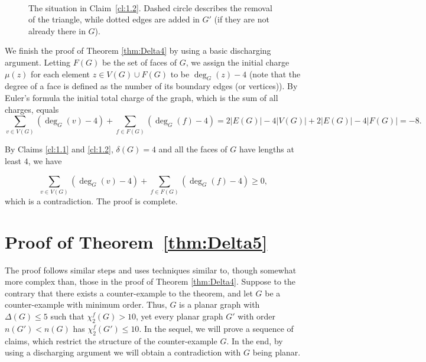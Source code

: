 \documentclass[10pt,a4paper]{article}
\newcommand{\fd}{\chi_{2}^{f}}
\begin{document}
\begin{figure}[ht!]
\begin{center}
 \\
	\caption{The situation in Claim~\ref{cl:1.2}. Dashed circle describes the removal of the triangle, while dotted edges are added in $G'$ (if they are not already there in $G$). }\label{fig:cl:1.2}
\end{center}
\end{figure}

We finish the proof of Theorem \ref{thm:Delta4} by using a basic discharging argument.
Letting $F(G)$ be the set of faces of $G$, we assign the initial charge $\mu(z)$ for each element $z\in V(G)\cup F(G)$ to be $\deg_G(z)-4$ (note that the degree of a face is defined as the number of its boundary edges (or vertices)). By Euler's formula the initial total charge of the graph, which is the sum of all charges, equals
$$\sum_{v\in V(G)}{(\deg_G(v)-4)}+\sum_{f\in F(G)}{(\deg_G(f)-4)}=2|E(G)|-4|V(G)|+2|E(G)|-4|F(G)|=-8.$$

By Claims \ref{cl:1.1} and \ref{cl:1.2}, $\delta(G)=4$ and all the faces of $G$ have lengths at least $4$, we have

$$\sum_{v\in V(G)}{(\deg_G(v)-4)}+\sum_{f\in F(G)}{(\deg_G(f)-4)}\ge 0,$$ which is a contradiction. The proof is complete.




\section{Proof of Theorem~\ref{thm:Delta5}}
\label{sec:Delta5}

The proof follows similar steps and uses techniques similar to, though somewhat more complex than, those in the proof of Theorem \ref{thm:Delta4}. Suppose to the contrary that there exists a counter-example to the theorem, and let $G$ be a counter-example with minimum order. Thus, $G$ is a planar graph with $\Delta(G)\le 5$ such that $\fd(G)>10$, yet every planar graph $G'$ with order $n(G')<n(G)$ has $\fd(G')\le 10$. In the sequel, we will prove a sequence of claims, which restrict the structure of the counter-example $G$. In the end, by using a discharging argument we will obtain a contradiction with $G$ being planar. 
\end{document}

